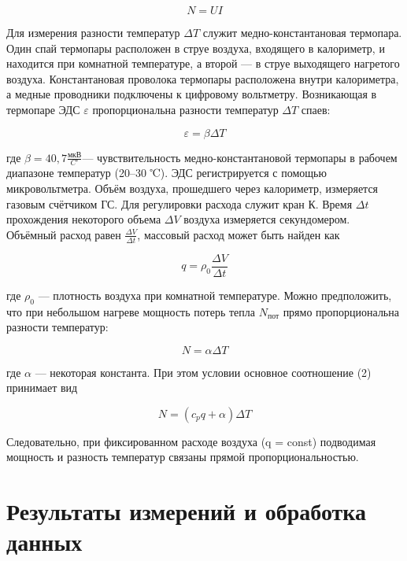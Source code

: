 \documentclass[a4paper,12pt]{article}
\begin{document}
\begin{equation}
    N = UI
\end{equation}

Для измерения разности температур $\Delta T$ служит медно-константановая термопара. Один спай термопары расположен в струе воздуха, входящего в калориметр, и находится при комнатной температуре, а второй — в струе выходящего нагретого воздуха. Константановая проволока термопары расположена внутри калориметра, а медные проводники подключены к цифровому вольтметру. Возникающая в термопаре ЭДС $\varepsilon$ пропорциональна разности температур $\Delta T$ спаев:

\begin{equation}
    \varepsilon = \beta \Delta T    
\end{equation}

где $\beta = 40,7 \frac{мкВ}{C^{\circ}}$— чувствительность медно-константановой термопары в рабочем диапазоне температур (20–30 ℃). ЭДС регистрируется с помощью микровольтметра. Объём воздуха, прошедшего через калориметр, измеряется газовым счётчиком ГС. Для регулировки расхода служит кран К. Время $\Delta t$ прохождения некоторого объема $\Delta V$ воздуха измеряется секундомером. Объёмный расход равен $\frac{\Delta V}{\Delta t}$, массовый расход может быть найден как

\begin{equation}
    q = \rho_0 \frac{\Delta V}{\Delta t}
\end{equation}

где $\rho_0$ — плотность воздуха при комнатной температуре. Можно предположить, что при небольшом нагреве мощность потерь тепла $N_\text{пот}$ прямо пропорциональна разности температур:

\begin{equation}\label{loss}
    N = \alpha \Delta T
\end{equation}

где $\alpha$ — некоторая константа. При этом условии основное соотношение (2) принимает вид

\begin{equation}\label{find-a}
    N = (c_p q + \alpha) \Delta T
\end{equation}

Следовательно, при фиксированном расходе воздуха (q = const) подводимая мощность и разность температур связаны прямой пропорциональностью.

\section{Результаты измерений и обработка данных}
\end{document}
